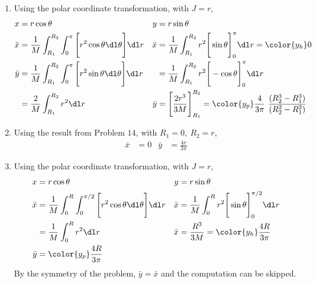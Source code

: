 \begin{enumerate}
    \item Using the polar coordinate transformation, with $ J = r $,
          \begin{align}
              x                        & = r\cos \theta                            &
              y                        & = r\sin \theta                              \\
              \bar{x}                  & = \frac{1}{M} \int_{R_1}^{R_2}
              \int_{0}^{\pi} \Bigg[ r^2 \cos \theta
              \dl \theta \Bigg]  \dl r &
              \bar{x}                  & = \frac{1}{M} \int_{R_1}^{R_2} r^2 \Bigg[
              \sin \theta \Bigg]_0^{\pi} \dl r = \color{y_h} 0                       \\
              \bar{y}                  & = \frac{1}{M} \int_{R_1}^{R_2}
              \int_{0}^{\pi} \Bigg[ r^2 \sin \theta
              \dl \theta \Bigg]  \dl r &
                                       & = \frac{1}{M} \int_{R_1}^{R_2} r^2 \Bigg[
              -\cos \theta \Bigg]_0^{\pi} \dl r                                      \\
                                       & = \frac{2}{M} \int_{R_1}^{R_2} r^2 \dl r  &
              \bar{y}                  & = \Bigg[\frac{2r^3}{3M}\Bigg]_{R_1}^{R_2}
              = \color{y_p} \frac{4}{3\pi}\ \frac{(R_2^3 - R_1^3)}{(R_2^2 - R_1^2)}
          \end{align}

    \item Using the result from Problem $ 14 $, with $ R_1 = 0,\ R_2 = r $,
          \begin{align}
              \bar{x} & = 0 & \bar{y} & = \frac{4r}{3\pi}
          \end{align}

    \item Using the polar coordinate transformation, with $ J = r $,
          \begin{align}
              x                        & = r\cos \theta                        &
              y                        & = r\sin \theta                          \\
              \bar{x}                  & = \frac{1}{M} \int_{0}^{R}
              \int_{0}^{\pi/2} \Bigg[ r^2 \cos \theta
              \dl \theta \Bigg]  \dl r &
              \bar{x}                  & = \frac{1}{M} \int_{0}^{R} r^2 \Bigg[
              \sin \theta \Bigg]_0^{\pi/2} \dl r                                 \\
                                       & = \frac{1}{M} \int_{0}^{R} r^2 \dl r  &
              \bar{x}                  & = \frac{R^3}{3M}
              = \color{y_h} \frac{4R}{3\pi}                                      \\
              \bar{y}                  & = \color{y_p} \frac{4R}{3\pi}
          \end{align}
          By the symmetry of the problem, $ \bar{y} = \bar{x} $ and the computation can
          be skipped.


\end{enumerate}
